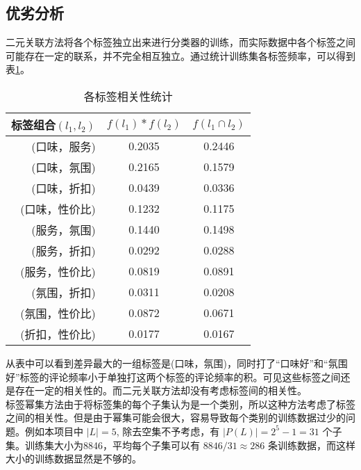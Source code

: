 \documentclass[a4paper, twocolumn]{article}
\begin{document}
\begin{CJK}{UTF8}{gbsn}
	\subsection{优劣分析}
	二元关联方法将各个标签独立出来进行分类器的训练，而实际数据中各个标签之间可能存在一定的联系，并不完全相互独立。通过统计训练集各标签频率，可以得到表\ref{tb:cor}。
	\begin{table}[h]
		\caption{各标签相关性统计}
		\label{tb:cor}
		\centering
		\begin{tabular}{| r | c | c |}
			\hline
			\textbf{标签组合$ (l_1, l_2) $} &\textbf{$ f(l_1)*f(l_2) $} & \textbf{$ f(l_1 \cap l_2) $}\\ 
			\hline
			(口味，服务)& 0.2035  & 0.2446  \\ 
			\hline
			(口味，氛围)& 0.2165 &  0.1579\\ 
			\hline
			(口味，折扣)& 0.0439 & 0.0336  \\ 
			\hline
			(口味，性价比)& 0.1232 & 0.1175 \\ 
			\hline
			(服务，氛围)& 0.1440 &  0.1498\\ 
			\hline
			(服务，折扣)& 0.0292 & 0.0288 \\ 
			\hline
			(服务，性价比)& 0.0819  & 0.0891 \\ 
			\hline
			(氛围，折扣)& 0.0311 &  0.0208\\ 
			\hline
			(氛围，性价比)& 0.0872 & 0.0671 \\ 
			\hline
			(折扣，性价比)& 0.0177 &  0.0167\\ 
			\hline
		\end{tabular}
	\end{table}
	\newline
	从表中可以看到差异最大的一组标签是(口味，氛围)，同时打了“口味好”和“氛围好”标签的评论频率小于单独打这两个标签的评论频率的积。可见这些标签之间还是存在一定的相关性的。而二元关联方法却没有考虑标签间的相关性。\\
	标签幂集方法由于将标签集的每个子集认为是一个类别，所以这种方法考虑了标签之间的相关性。但是由于幂集可能会很大，容易导致每个类别的训练数据过少的问题。例如本项目中 $ |L|=5 $, 除去空集不予考虑，有 $ |P(L)| = 2 ^ 5 -1 = 31 $ 个子集。训练集大小为8846，平均每个子集可以有 $ 8846/ 31 \approx 286 $ 条训练数据，而这样大小的训练数据显然是不够的。

\end{CJK}
\end{document}
